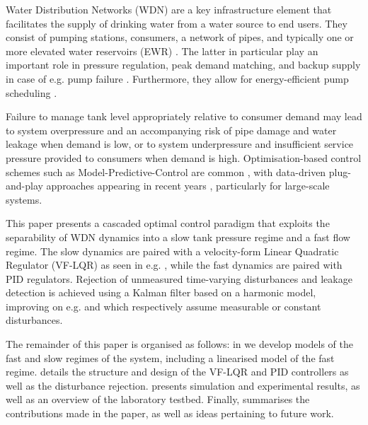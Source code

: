 
Water Distribution Networks (WDN) are a key infrastructure element that facilitates the supply of drinking water from a water source to end users. They consist of pumping stations, consumers, a network of pipes, and typically one or more elevated water reservoirs (EWR) \cite{Swamee2008}. The latter in particular play an important role in pressure regulation, peak demand matching, and backup supply in case of e.g. pump failure \cite{Creaco2019}. Furthermore, they allow for energy-efficient pump scheduling \cite{Rathore1030,Bello2019}.  

Failure to manage tank level appropriately relative to consumer demand may lead to system overpressure and an accompanying risk of pipe damage and water leakage when demand is low, or to system underpressure and insufficient service pressure provided to consumers when demand is high. Optimisation-based control schemes such as Model-Predictive-Control are common \cite{OcampoMartinez2013,Kallesoe2017}, with data-driven plug-and-play approaches appearing in recent years \cite{Val2020}, particularly for large-scale systems.  

This paper presents a cascaded optimal control paradigm that exploits the separability of WDN dynamics into a slow tank pressure regime and a fast flow regime. The slow dynamics are paired with a velocity-form Linear Quadratic Regulator (VF-LQR) as seen in e.g. \cite{Pannocchia2015a}, while the fast dynamics are paired with PID regulators. Rejection of unmeasured time-varying disturbances and leakage detection is achieved using a Kalman filter based on a harmonic model, improving on e.g. \cite{OcampoMartinez2013} and \cite{Val2020} which respectively assume measurable or constant disturbances.

The remainder of this paper is organised as follows: in  we develop models of the fast and slow regimes of the system, including a linearised model of the fast regime.  details the structure and design of the VF-LQR and PID controllers as well as the disturbance rejection.  presents simulation and experimental results, as well as an overview of the laboratory testbed. Finally,  summarises the contributions made in the paper, as well as ideas pertaining to future work.